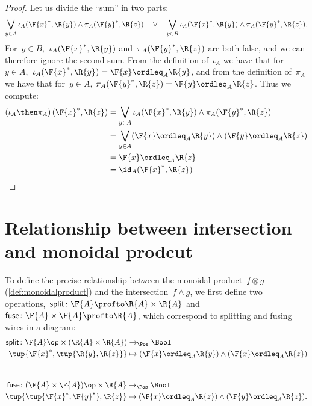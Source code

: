 \begin{proof}
    Let us divide the ``sum'' in two parts:
    \begin{equation}
        \bigvee_{y \in A} \iota_A(\F{x}^*,\R{y}) \wedge \pi_A(\F{y}^*,\R{z}) \quad\vee\quad
        \bigvee_{y \in B} \iota_A(\F{x}^*,\R{y}) \wedge \pi_A(\F{y}^*,\R{z}).
    \end{equation}
    For~$y \in B$,~$\iota_A(\F{x}^*,\R{y})$ and~$\pi_A(\F{y}^*,\R{z})$ are both false, and we can therefore ignore the second sum.
    From the definition of~$\iota_A$ we have that for~$y\in A$,~$ \iota_A(\F{x}^*,\R{y})=\F{x} \ordleq_A \R{y}$, and from the definition of~$\pi_A$ we have that for~$y\in A$, $\pi_A(\F{y}^*,\R{z})=\F{y} \ordleq_A \R{z}$. Thus we compute:
    \begin{equation}
        \begin{aligned}
            \left(\iota_A\then \pi_A\right)(\F{x}^*, \R{z}) &= \bigvee_{y \in A} \iota_A(\F{x}^*,\R{y}) \wedge \pi_A(\F{y}^*,\R{z})  \\
            &= \bigvee_{y \in A} (\F{x} \ordleq_A \R{y}) \wedge  (\F{y} \ordleq_A \R{z}) \\
            &= \F{x} \ordleq_A \R{z}\\
            &= \id_A(\F{x}^*, \R{z})
        \end{aligned}
    \end{equation}
\end{proof}


\section{Relationship between intersection and monoidal prodcut}
To define the precise relationship between the monoidal product~$f \otimes g$ (\cref{def:monoidalproduct}) and the intersection~$f \wedge g$, we first define two operations,~$\mathsf{split} \colon \F{A} \profto \R{A} \times \R{A}$ and~$\mathsf{fuse} \colon \F{A} \times \F{A} \profto \R{A}$, which correspond to splitting and fusing wires in a diagram:
\begin{equation}
    \begin{aligned}
        \mathsf{split} \colon \F{A}\op \times (\R{A} \times \R{A}) &\to_\Pos \Bool \\
        \tup{\F{x}^*, \tup{\R{y}, \R{z}}} &\mapsto (\F{x} \ordleq_A \R{y}) \wedge (\F{x} \ordleq_A \R{z})
    \end{aligned}
\end{equation}
~
\begin{equation}
    \begin{aligned}
        \mathsf{fuse} \colon (\F{A} \times \F{A})\op \times \R{A} &\to_\Pos \Bool \\
        \tup{ \tup{\F{x}^*, \F{y}^*}, \R{z}} &\mapsto (\F{x} \ordleq_A \R{z}) \wedge (\F{y} \ordleq_A \R{z}).
    \end{aligned}
\end{equation}


